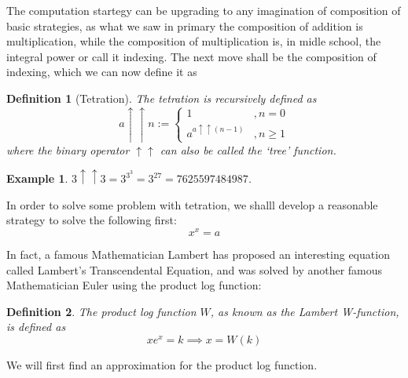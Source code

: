 \documentclass[12pt]{article}
\newtheorem{definition}{Definition}
\newtheorem*{example}{Example}
\begin{document}
    The computation startegy can be upgrading to any imagination of composition of basic strategies, as what we saw in primary the composition of addition is multiplication, while the composition of multiplication is, in midle school, the integral power or call it indexing. The next move shall be the composition of indexing, which we can now define it as 

    \begin{definition}[Tetration]
        The tetration is recursively defined as $$a\uparrow\uparrow n :=\begin{cases}
            1&,n=0\\
            a^{a\uparrow\uparrow (n-1)}&, n\geq 1
        \end{cases}$$
        where the binary operator $\uparrow\uparrow$ can also be called the `tree' function.
    \end{definition}

    \begin{example}
        $3\uparrow\uparrow 3=3^{3^3}=3^{27}=7625597484987$.
    \end{example}

    In order to solve some problem with tetration, we shalll develop a reasonable strategy to solve the following first: $$x^x=a$$

    In fact, a famous Mathematician Lambert has proposed an interesting equation called Lambert's Transcendental Equation, and was solved by another famous Mathematician Euler using the product log function:

    \begin{definition}
        The product log function $W$, as known as the Lambert W-function, is defined as $$xe^x=k \implies x=W(k)$$
    \end{definition}

    We will first find an approximation for the product log function.
\end{document}
